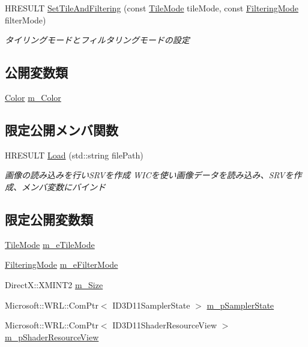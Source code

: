\begin{DoxyCompactItemize}
\item 
H\+R\+E\+S\+U\+LT \hyperlink{class_a_p_i_1_1abstract_aa58242e8408771bda104c984a0e476bd}{Set\+Tile\+And\+Filtering} (const \hyperlink{class_a_p_i_1_1abstract_a0a6f8b1d41f00f3b6bd7566adbcf4f36}{Tile\+Mode} tile\+Mode, const \hyperlink{class_a_p_i_1_1abstract_a520ef65de715096fdca5c71afa9273a1}{Filtering\+Mode} filter\+Mode)
\begin{DoxyCompactList}\small\item\em タイリングモードとフィルタリングモードの設定 \end{DoxyCompactList}\end{DoxyCompactItemize}
\subsection*{公開変数類}
\begin{DoxyCompactItemize}
\item 
\hyperlink{class_color}{Color} \hyperlink{class_a_p_i_1_1abstract_a91f4e4cb69b7fa77ce4c2f224d7980cc}{m\+\_\+\+Color}
\end{DoxyCompactItemize}
\subsection*{限定公開メンバ関数}
\begin{DoxyCompactItemize}
\item 
H\+R\+E\+S\+U\+LT \hyperlink{class_a_p_i_1_1abstract_ad78bf31f9df322ccdc67c509a0283a37}{Load} (std\+::string file\+Path)
\begin{DoxyCompactList}\small\item\em 画像の読み込みを行い\+S\+R\+Vを作成  W\+I\+Cを使い画像データを読み込み、\+S\+R\+Vを作成、メンバ変数にバインド \end{DoxyCompactList}\end{DoxyCompactItemize}
\subsection*{限定公開変数類}
\begin{DoxyCompactItemize}
\item 
\hyperlink{class_a_p_i_1_1abstract_a0a6f8b1d41f00f3b6bd7566adbcf4f36}{Tile\+Mode} \hyperlink{class_a_p_i_1_1abstract_ac3e6155bd6f42e0485e99c91b99a1970}{m\+\_\+e\+Tile\+Mode}
\item 
\hyperlink{class_a_p_i_1_1abstract_a520ef65de715096fdca5c71afa9273a1}{Filtering\+Mode} \hyperlink{class_a_p_i_1_1abstract_ac28f3c414d9557e103174d98fb45ac80}{m\+\_\+e\+Filter\+Mode}
\item 
Direct\+X\+::\+X\+M\+I\+N\+T2 \hyperlink{class_a_p_i_1_1abstract_adb6dc678fde02000203c71a186713543}{m\+\_\+\+Size}
\item 
Microsoft\+::\+W\+R\+L\+::\+Com\+Ptr$<$ I\+D3\+D11\+Sampler\+State $>$ \hyperlink{class_a_p_i_1_1abstract_a94fdba7a2106647566ca2a907c0bd5e7}{m\+\_\+p\+Sampler\+State}
\item 
Microsoft\+::\+W\+R\+L\+::\+Com\+Ptr$<$ I\+D3\+D11\+Shader\+Resource\+View $>$ \hyperlink{class_a_p_i_1_1abstract_a46609e86f9414823aa6403ebbfcef380}{m\+\_\+p\+Shader\+Resource\+View}
\end{DoxyCompactItemize}
